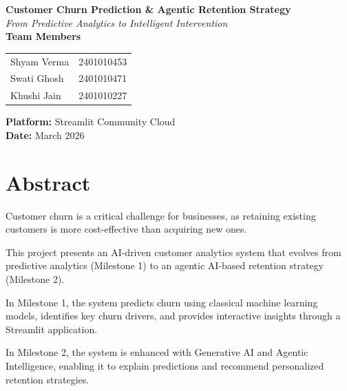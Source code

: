 \documentclass[12pt]{article}
\begin{document}
\begin{center}

\vspace*{2cm}

{\LARGE \textbf{Customer Churn Prediction \& Agentic Retention Strategy}}\\[0.5cm]

{\large \textit{From Predictive Analytics to Intelligent Intervention}}\\[2cm]

\textbf{\Large Team Members}\\[0.5cm]

\begin{tabular}{ll}
Shyam Verma & 2401010453 \\
Swati Ghosh & 2401010471 \\
Khushi Jain & 2401010227 \\
\end{tabular}

\vspace{2cm}

\textbf{Platform:} Streamlit Community Cloud\\
\textbf{Date:} March 2026

\vfill

\end{center}

\newpage

\section*{Abstract}

Customer churn is a critical challenge for businesses, as retaining existing customers is more cost-effective than acquiring new ones.

This project presents an AI-driven customer analytics system that evolves from predictive analytics (Milestone 1) to an agentic AI-based retention strategy (Milestone 2).

In Milestone 1, the system predicts churn using classical machine learning models, identifies key churn drivers, and provides interactive insights through a Streamlit application.

In Milestone 2, the system is enhanced with Generative AI and Agentic Intelligence, enabling it to explain predictions and recommend personalized retention strategies.

\newpage
\end{document}

